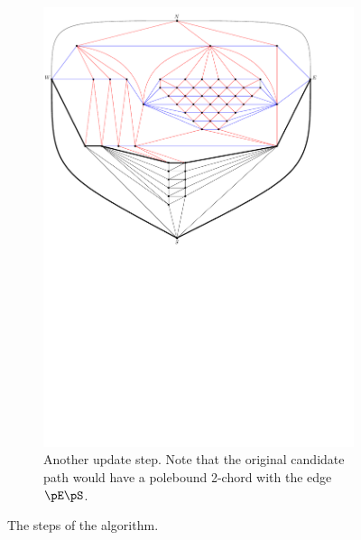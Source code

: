 \begin{figure}
\begin{subfigure}[b]{.9 \textwidth}
      \includegraphics[width=\textwidth]{examples/img/vertWorstCase/sweep6}
      \caption{Another update step. Note that the original candidate path would have a polebound 2-chord with the edge $\pE \pS$.}
      \label{fig:ex:vert:sweep6}
    \end{subfigure}
    \caption{The steps of the algorithm.}
\end{figure}

